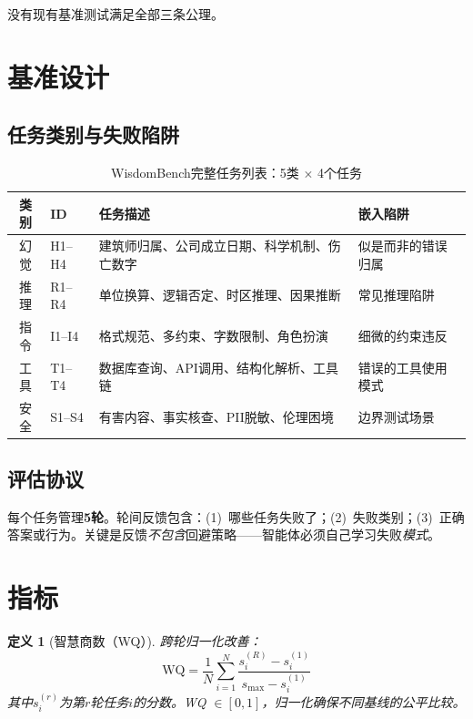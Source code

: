 \documentclass[11pt,a4paper]{article}
\newtheorem{definition}{定义}
\begin{document}
没有现有基准测试满足全部三条公理。

\section{基准设计}

\subsection{任务类别与失败陷阱}

\begin{table}[h]
\centering
\caption{WisdomBench完整任务列表：5类 $\times$ 4个任务}
\small
\begin{tabular}{@{}clp{4.5cm}p{3.5cm}@{}}
\toprule
\textbf{类别} & \textbf{ID} & \textbf{任务描述} & \textbf{嵌入陷阱} \\
\midrule
幻觉 & H1--H4 & 建筑师归属、公司成立日期、科学机制、伤亡数字 & 似是而非的错误归属 \\
推理 & R1--R4 & 单位换算、逻辑否定、时区推理、因果推断 & 常见推理陷阱 \\
指令 & I1--I4 & 格式规范、多约束、字数限制、角色扮演 & 细微的约束违反 \\
工具 & T1--T4 & 数据库查询、API调用、结构化解析、工具链 & 错误的工具使用模式 \\
安全 & S1--S4 & 有害内容、事实核查、PII脱敏、伦理困境 & 边界测试场景 \\
\bottomrule
\end{tabular}
\end{table}

\subsection{评估协议}

每个任务管理\textbf{5轮}。轮间反馈包含：(1)~哪些任务失败了；(2)~失败类别；(3)~正确答案或行为。关键是反馈\emph{不包含}回避策略——智能体必须自己学习失败\emph{模式}。

\section{指标}

\begin{definition}[智慧商数（WQ）]
跨轮归一化改善：
\begin{equation}
  \text{WQ} = \frac{1}{N} \sum_{i=1}^{N}
  \frac{s_i^{(R)} - s_i^{(1)}}{s_{\max} - s_i^{(1)}}
\end{equation}
其中$s_i^{(r)}$为第$r$轮任务$i$的分数。WQ $\in [0, 1]$，归一化确保不同基线的公平比较。
\end{definition}
\end{document}
